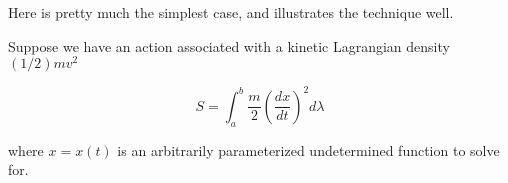 \documentclass{article}
\begin{document}
Here is pretty much the simplest case, and illustrates the technique well.

Suppose we have an action associated with a kinetic Lagrangian density $(1/2) m v^2$

\begin{equation*}
S = \int_a^b \frac{m}{2} { \left(\frac{dx}{dt}\right) }^2 d\lambda
\end{equation*}

where $x = x(t)$ is an arbitrarily parameterized undetermined function to solve for.




\end{document}
